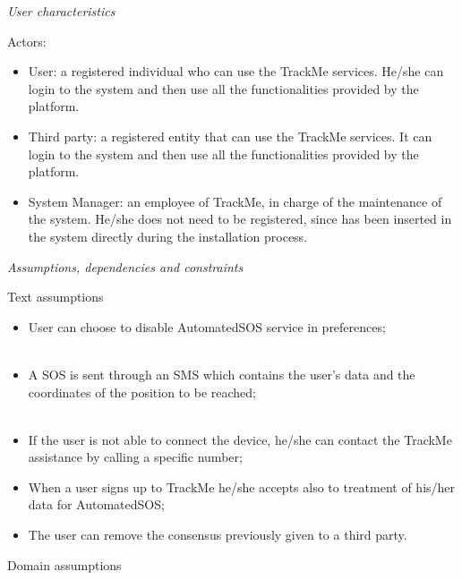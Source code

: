 \documentclass{article}
\begin{document}
\begin{legal}
\begin{legal}
{\begin{itemize}
		\end{itemize}
		}
		\item \textit{User characteristics} \\
			{\normalfont
			Actors:\\
			\begin{itemize}
			 \item User: a registered individual who can use the TrackMe services. He/she can login to the system and then use all the functionalities provided by the platform.\\
			\item Third party: a registered entity that can use the TrackMe services. It can login to the system and then use all the functionalities provided by the platform.\\
 			\item System Manager:  an employee of TrackMe, in charge of the maintenance of the system. He/she does not need to be registered, since has been inserted in the system directly during the installation process.\\
			\end{itemize}
			}
		\item \textit{Assumptions, dependencies and constraints}
			\begin{legal}
    			\item Text assumptions\\
    			{\normalfont
				\begin{itemize}
					\item User can choose to disable AutomatedSOS service in preferences;\\\
					\item A SOS is sent through an SMS which contains the user's data and the coordinates of the position to be reached;\\\
					\item If the user is not able to connect the device, he/she can contact the TrackMe assistance by calling a specific number;\\
					\item When a user signs up to TrackMe he/she accepts also to treatment of his/her data for AutomatedSOS;\\
					\item The user can remove the consensus previously given to a third party.\\
				\end{itemize}}
			\newpage
			\item Domain assumptions \\

\end{legal}
\end{legal}
\end{legal}
\end{document}
